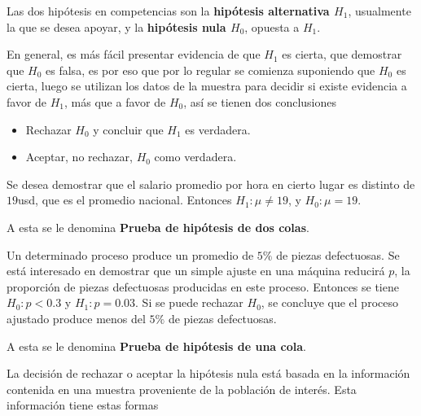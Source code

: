 \begin{Def}
Las dos hip\'otesis en competencias son la \textbf{hip\'otesis alternativa $H_{1}$}, usualmente la que se desea apoyar, y la \textbf{hip\'otesis nula $H_{0}$}, opuesta a $H_{1}$.
\end{Def}









En general, es m\'as f\'acil presentar evidencia de que $H_{1}$ es cierta, que demostrar 	que $H_{0}$ es falsa, es por eso que por lo regular se comienza suponiendo que $H_{0}$ es cierta, luego se utilizan los datos de la muestra para decidir si existe evidencia a favor de $H_{1}$, m\'as que a favor de $H_{0}$, as\'i se tienen dos conclusiones
\begin{itemize}
\item Rechazar $H_{0}$ y concluir que $H_{1}$ es verdadera.
\item Aceptar, no rechazar, $H_{0}$ como verdadera.

\end{itemize}

\begin{Ejem}
Se desea demostrar que el salario promedio  por hora en cierto lugar es distinto de $19$usd, que es el promedio nacional. Entonces $H_{1}:\mu\neq19$, y $H_{0}:\mu=19$.
\end{Ejem}
A esta se le denomina \textbf{Prueba de hip\'otesis de dos colas}.










\begin{Ejem}
Un determinado proceso produce un promedio de $5\%$ de piezas defectuosas. Se est\'a interesado en demostrar que un simple ajuste en una m\'aquina reducir\'a $p$, la proporci\'on de piezas defectuosas producidas en este proceso. Entonces se tiene $H_{0}:p<0.3$ y $H_{1}:p=0.03$. Si se puede rechazar $H_{0}$, se concluye que el proceso ajustado produce menos del $5\%$ de piezas defectuosas.
\end{Ejem}
A esta se le denomina \textbf{Prueba de hip\'otesis de una cola}.

La decisi\'on de rechazar o aceptar la hip\'otesis nula est\'a basada en la informaci\'on contenida en una muestra proveniente de la poblaci\'on de inter\'es. Esta informaci\'on tiene estas formas




